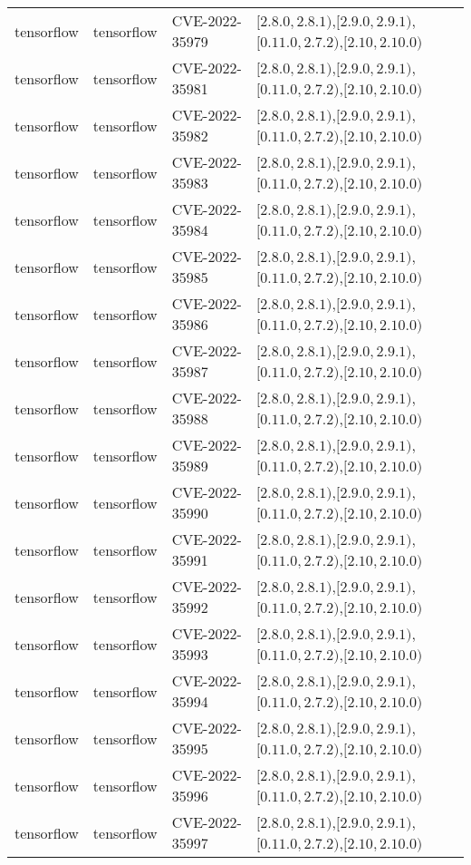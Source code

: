 \begin{tabular}{llll}
tensorflow & tensorflow & CVE-2022-35979 & $[2.8.0,2.8.1)$,$[2.9.0,2.9.1)$,$[0.11.0,2.7.2)$,$[2.10,2.10.0)$ \\
tensorflow & tensorflow & CVE-2022-35981 & $[2.8.0,2.8.1)$,$[2.9.0,2.9.1)$,$[0.11.0,2.7.2)$,$[2.10,2.10.0)$ \\
tensorflow & tensorflow & CVE-2022-35982 & $[2.8.0,2.8.1)$,$[2.9.0,2.9.1)$,$[0.11.0,2.7.2)$,$[2.10,2.10.0)$ \\
tensorflow & tensorflow & CVE-2022-35983 & $[2.8.0,2.8.1)$,$[2.9.0,2.9.1)$,$[0.11.0,2.7.2)$,$[2.10,2.10.0)$ \\
tensorflow & tensorflow & CVE-2022-35984 & $[2.8.0,2.8.1)$,$[2.9.0,2.9.1)$,$[0.11.0,2.7.2)$,$[2.10,2.10.0)$ \\
tensorflow & tensorflow & CVE-2022-35985 & $[2.8.0,2.8.1)$,$[2.9.0,2.9.1)$,$[0.11.0,2.7.2)$,$[2.10,2.10.0)$ \\
tensorflow & tensorflow & CVE-2022-35986 & $[2.8.0,2.8.1)$,$[2.9.0,2.9.1)$,$[0.11.0,2.7.2)$,$[2.10,2.10.0)$ \\
tensorflow & tensorflow & CVE-2022-35987 & $[2.8.0,2.8.1)$,$[2.9.0,2.9.1)$,$[0.11.0,2.7.2)$,$[2.10,2.10.0)$ \\
tensorflow & tensorflow & CVE-2022-35988 & $[2.8.0,2.8.1)$,$[2.9.0,2.9.1)$,$[0.11.0,2.7.2)$,$[2.10,2.10.0)$ \\
tensorflow & tensorflow & CVE-2022-35989 & $[2.8.0,2.8.1)$,$[2.9.0,2.9.1)$,$[0.11.0,2.7.2)$,$[2.10,2.10.0)$ \\
tensorflow & tensorflow & CVE-2022-35990 & $[2.8.0,2.8.1)$,$[2.9.0,2.9.1)$,$[0.11.0,2.7.2)$,$[2.10,2.10.0)$ \\
tensorflow & tensorflow & CVE-2022-35991 & $[2.8.0,2.8.1)$,$[2.9.0,2.9.1)$,$[0.11.0,2.7.2)$,$[2.10,2.10.0)$ \\
tensorflow & tensorflow & CVE-2022-35992 & $[2.8.0,2.8.1)$,$[2.9.0,2.9.1)$,$[0.11.0,2.7.2)$,$[2.10,2.10.0)$ \\
tensorflow & tensorflow & CVE-2022-35993 & $[2.8.0,2.8.1)$,$[2.9.0,2.9.1)$,$[0.11.0,2.7.2)$,$[2.10,2.10.0)$ \\
tensorflow & tensorflow & CVE-2022-35994 & $[2.8.0,2.8.1)$,$[2.9.0,2.9.1)$,$[0.11.0,2.7.2)$,$[2.10,2.10.0)$ \\
tensorflow & tensorflow & CVE-2022-35995 & $[2.8.0,2.8.1)$,$[2.9.0,2.9.1)$,$[0.11.0,2.7.2)$,$[2.10,2.10.0)$ \\
tensorflow & tensorflow & CVE-2022-35996 & $[2.8.0,2.8.1)$,$[2.9.0,2.9.1)$,$[0.11.0,2.7.2)$,$[2.10,2.10.0)$ \\
tensorflow & tensorflow & CVE-2022-35997 & $[2.8.0,2.8.1)$,$[2.9.0,2.9.1)$,$[0.11.0,2.7.2)$,$[2.10,2.10.0)$ \\

\end{tabular}
